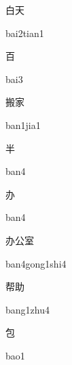 \begin{multicols*}{2}
\begin{verbete}{白天}
\begin{pronuncia}{bai2tian1}
\end{pronuncia}
\end{verbete}

\begin{verbete}[bai3]{百}
\begin{pronuncia}{bai3}
\end{pronuncia}
\end{verbete}

\begin{verbete}{搬家}
\begin{pronuncia}{ban1jia1}
\end{pronuncia}
\end{verbete}

\begin{verbete}[ban4]{半}
\begin{pronuncia}{ban4}
\end{pronuncia}
\end{verbete}

\begin{verbete}[ban4]{办}
\begin{pronuncia}{ban4}
\end{pronuncia}
\end{verbete}

\begin{verbete}{办公室}
\begin{pronuncia}{ban4gong1shi4}
\end{pronuncia}
\end{verbete}

\begin{verbete}{帮助}
\begin{pronuncia}{bang1zhu4}
\end{pronuncia}
\end{verbete}

\begin{verbete}[bao1]{包}
\begin{pronuncia}{bao1}
\end{pronuncia}
\end{verbete}


\end{multicols*}

